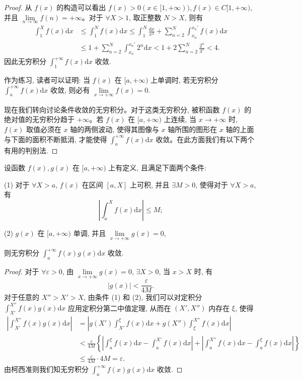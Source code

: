 \begin{proof}
从 $f(x)$ 的构造可以看出 $f(x)>0(x\in[1,+\infty)), f(x)\in C[1,+\infty)$, 并且 $\lim\limits_{n\to\infty}f(n)=+\infty$。对于 $\forall X>1$, 取正整数 $N>X$, 则有
\[
\begin{aligned}
  \int_1^X f(x)\mathrm dx
  &\leq
  \int_1^N f(x)\mathrm dx
  \leq
  \int_1^N\frac{\mathrm dx}{x^2}
  +
  \sum_{n=2}^N\int_{x_n}^{x_n'}f(x)\mathrm dx\\
  &\leq
  1+\sum_{n=2}^N\int_{x_n}^{x_n'}2^n\mathrm dx
  <
  1+2\sum_{n=2}^N\frac{2^n}{3^n}<4.
\end{aligned}
\]
因此无穷积分 $\int_1^{+\infty}f(x)\mathrm dx$ 收敛.

作为练习, 读者可以证明: 当 $f(x)$ 在 $[a,+\infty)$ 上单调时, 若无穷积分 $\int_a^{+\infty}f(x)\mathrm dx$ 收敛, 则必有 $\lim\limits_{x\to+\infty}f(x)=0$.

现在我们转向讨论条件收敛的无穷积分。对于这类无穷积分, 被积函数 $f(x)$ 的绝对值的无穷积分趋于 $+\infty$。若 $f(x)$ 在 $[a,+\infty)$ 上连续, 当 $x\to+\infty$ 时, $f(x)$ 取值必须在 $x$ 轴的两侧波动, 使得其图像与 $x$ 轴所围的图形在 $x$ 轴的上面与下面的面积不断抵消, 才能使得 $\int_a^{+\infty}f(x)\mathrm dx$ 收敛。在此方面我们有以下两个有用的判别法.
\end{proof}


\begin{theorem}[{狄利克雷判别法}]\label{theorem:ma-8-2-5}
设函数 $f(x),g(x)$ 在 $[a,+\infty)$ 上有定义, 且满足下面两个条件:

(1) 对于 $\forall X>a$, $f(x)$ 在区间 $[a,X]$ 上可积, 并且 $\exists M>0$, 使得对于 $\forall X>a$, 有
\[
  \left|\int_a^X f(x)\mathrm dx\right|\leq M;
\]

(2) $g(x)$ 在 $[a,+\infty)$ 单调, 并且 $\lim\limits_{x\to+\infty}g(x)=0$,

则无穷积分 $\int_a^{+\infty}f(x)g(x)\mathrm dx$ 收敛.
\end{theorem}


\begin{proof}
对于 $\forall\varepsilon>0$, 由 $\lim\limits_{x\to+\infty}g(x)=0$, $\exists X>0$, 当 $x>X$ 时, 有
\[
  |g(x)|<\frac{\varepsilon}{4M}.
\]
对于任意的 $X''>X'>X$, 由条件 (1) 和 (2), 我们可以对定积分 $\int_{X'}^{X''}f(x)g(x)\mathrm dx$ 应用定积分第二中值定理, 从而在 $(X',X'')$ 内存在 $\xi$, 使得
\[
\begin{aligned}
  \left|\int_{X'}^{X''}f(x)g(x)\mathrm dx\right|
  &=
  \left|g(X')\int_{X'}^\xi f(x)\mathrm dx
  +
  g(X'')\int_\xi^{X''}f(x)\mathrm dx\right|\\
  &<
  \frac{\varepsilon}{4M}
  \left\{
  \left|\int_a^\xi f(x)\mathrm dx-\int_a^{X'}f(x)\mathrm dx\right|
  +
  \left|\int_a^{X''}f(x)\mathrm dx-\int_a^\xi f(x)\mathrm dx\right|
  \right\}\\
  &\leq \frac{\varepsilon}{4M}\cdot4M=\varepsilon.
\end{aligned}
\]
由柯西准则我们知无穷积分 $\int_a^{+\infty}f(x)g(x)\mathrm dx$ 收敛.
\end{proof}


